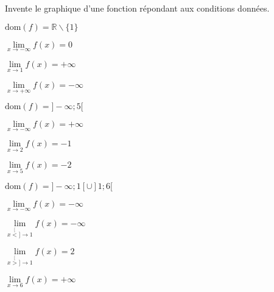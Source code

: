 \documentclass[a4paper,12pt]{report}
\newcommand{\IR}{\mathbb{R}}
\newcommand{\dom}{\mathrm{dom}}
\newcommand{\tog}{\stackrel[<]{}{\to}}
\newcommand{\tod}{\stackrel[>]{}{\to}}
\newcommand{\pinf}{+\infty}
\newcommand{\minf}{-\infty}
\begin{document}
\begin{exercice}
Invente le graphique d'une fonction répondant aux conditions données.

\par \setlength{\columnseprule}{0 pt}
          \begin{minipage}[t]{\linewidth}
          \begin{multicols}{2}

\vspace{1cm}
\begin{center}
\(\dom(f)=\IR\backslash\{1\}\)

\(\lim\limits_{x\to \minf}f(x)=0\)

\(\lim\limits_{x\to 1}f(x)=\pinf\)

\(\lim\limits_{x\to\pinf}f(x)=\minf\)
\end{center}



\end{multicols}\end{minipage}

\par \setlength{\columnseprule}{0 pt}
          \begin{minipage}[t]{\linewidth}
          \begin{multicols}{2}

\vspace{1cm}
\begin{center}
\(\dom(f)=]\minf;5[\)

\(\lim\limits_{x\to \minf}f(x)=\pinf\)

\(\lim\limits_{x\to 2}f(x)=-1\)

\(\lim\limits_{x\to 5}f(x)=-2\)
\end{center}



\end{multicols}\end{minipage}

\par \setlength{\columnseprule}{0 pt}
          \begin{minipage}[t]{\linewidth}
          \begin{multicols}{2}

\vspace{0.1cm}
\begin{center}
\(\dom(f)=]\minf;1[\cup]1;6[\)

\(\lim\limits_{x\to \minf}f(x)=\minf\)

\(\lim\limits_{x\tog 1}f(x)=\minf\)

\(\lim\limits_{x\tod 1}f(x)=2\)

\(\lim\limits_{x\to 6}f(x)=+\infty\)
\end{center}



\end{multicols}\end{minipage}
\end{exercice}
\newpage
\end{document}
